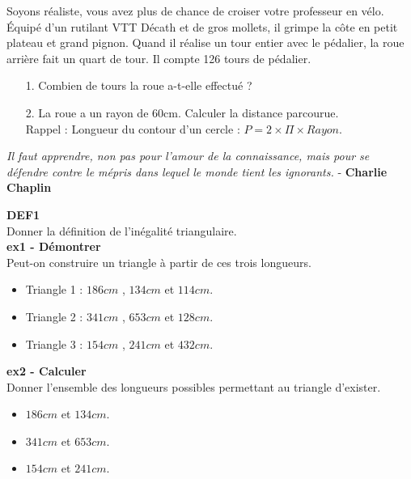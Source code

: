 Soyons réaliste, vous avez plus de chance de croiser votre professeur en vélo. Équipé d'un rutilant VTT Décath et de gros mollets, il grimpe la côte en petit plateau et grand pignon. Quand il réalise un tour entier avec le pédalier, la roue arrière fait un quart de tour. Il compte 126 tours de pédalier. 

\begin{enumerate}
  \item[1.] Combien de tours la roue a-t-elle effectué ?
  \item[2.] La roue a un rayon de 60cm. Calculer la distance parcourue. \\
    Rappel : Longueur du contour d'un cercle : $P = 2 \times \Pi \times Rayon$.   
\end{enumerate}

\newpage

\begin{center}
  \textit{Il faut apprendre, non pas pour l'amour de la connaissance, mais pour se défendre contre le mépris dans lequel le monde tient les ignorants.} - \textbf{Charlie Chaplin}
\end{center}

\textbf{DEF1} \\

Donner la définition de l'inégalité triangulaire.\\

\textbf{ex1 - Démontrer} \\

Peut-on construire un triangle à partir de ces trois longueurs.

\begin{itemize}[label={$\bullet$}]
  \item Triangle 1 : $186cm$ , $134cm$  et $114cm$.
  \item Triangle 2 : $341cm$ , $653cm$ et $128cm$.
  \item Triangle 3 : $154cm$ , $241cm$ et $432cm$.
\end{itemize} 

\textbf{ex2 - Calculer} \\

Donner l'ensemble des longueurs possibles permettant au triangle d'exister. 

\begin{itemize}[label={$\bullet$}]
  \item $186cm$ et $134cm$.
  \item $341cm$ et $653cm$.
  \item $154cm$ et $241cm$.
\end{itemize}

